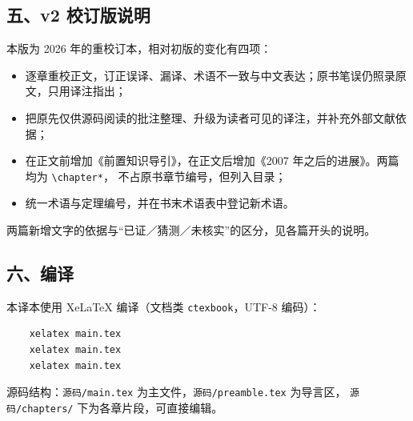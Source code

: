 \subsection*{五、v2 校订版说明}

本版为 2026 年的重校订本，相对初版的变化有四项：
\begin{itemize}[leftmargin=1.8em]
    \item 逐章重校正文，订正误译、漏译、术语不一致与中文表达；原书笔误仍照录原文，只用译注指出；
    \item 把原先仅供源码阅读的批注整理、升级为读者可见的译注，并补充外部文献依据；
    \item 在正文前增加《前置知识导引》，在正文后增加《2007 年之后的进展》。两篇均为 \verb|\chapter*|，
          不占原书章节编号，但列入目录；
    \item 统一术语与定理编号，并在书末术语表中登记新术语。
\end{itemize}
两篇新增文字的依据与“已证／猜测／未核实”的区分，见各篇开头的说明。

\subsection*{六、编译}

本译本使用 XeLaTeX{} 编译（文档类 \texttt{ctexbook}，UTF-8 编码）：

\begin{verbatim}
    xelatex main.tex
    xelatex main.tex
    xelatex main.tex
\end{verbatim}

源码结构：\texttt{源码/main.tex} 为主文件，\texttt{源码/preamble.tex} 为导言区，
\texttt{源码/chapters/} 下为各章片段，可直接编辑。

